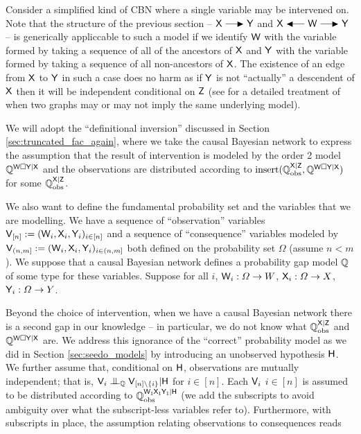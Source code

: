 Consider a simplified kind of CBN where a single variable may be intervened on. Note that the structure of the previous section -- $\RV{X}\longrightarrowRHD \RV{Y}$ and $\RV{X}\longleftarrowRHD \RV{W} \longrightarrowRHD \RV{Y}$ -- is generically appliccable to such a model if we identify $\mathsf{W}$ with the variable formed by taking a sequence of all of the ancestors of $\mathsf{X}$ and $\mathsf{Y}$ with the variable formed by taking a sequence of all non-ancestors of $\mathsf{X}$. The existence of an edge from $\mathsf{X}$ to $\mathsf{Y}$ in such a case does no harm as if $\mathsf{Y}$ is not ``actually'' a descendent of $\mathsf{X}$ then it will be independent conditional on $\mathsf{Z}$ (see \citet{pearl_book_2018} for a detailed treatment of when two graphs may or may not imply the same underlying model).

We will adopt the ``definitional inversion'' discussed in Section \ref{sec:truncated_fac_again}, where we take the causal Bayesian network to express the assumption that the result of intervention is modeled by the order 2 model $\mathbb{Q}^{\mathsf{W}\square \mathsf{Y}|\mathsf{X}}$ and the observations are distributed according to $\text{insert}(\mathbb{Q}_{\text{obs}}^{\mathsf{X}|\mathsf{Z}},\mathbb{Q}^{\mathsf{W}\square\mathsf{Y}|\mathsf{X}})$ for some $\mathbb{Q}_{\text{obs}}^{\mathsf{X}|\mathsf{Z}}$.

We also want to define the fundamental probability set and the variables that we are modelling. We have a sequence of ``observation'' variables $\mathsf{V}_{[n]}:=(\mathsf{W}_i,\mathsf{X}_i,\mathsf{Y}_i)_{i\in [n]}$ and a sequence of ``consequence'' variables modeled by $\mathsf{V}_{(n,m]}:=(\mathsf{W}_i,\mathsf{X}_i,\mathsf{Y}_i)_{i\in (n,m]}$ both defined on the probability set $\Omega$ (assume $n<m$). We suppose that a causal Bayesian network defines a probability gap model $\mathbb{Q}$ of some type for these variables. Suppose for all $i$, $\mathsf{W}_i:\Omega\to W$, $\mathsf{X}_i:\Omega\to X$, $\mathsf{Y}_i:\Omega\to Y$.

Beyond the choice of intervention, when we have a causal Bayesian network there is a second gap in our knowledge -- in particular, we do not know what $\mathbb{Q}_{\text{obs}}^{\mathsf{X}|\mathsf{Z}}$ and $\mathbb{Q}^{\mathsf{W}\square\mathsf{Y}|\mathsf{X}}$ are. We address this ignorance of the ``correct'' probability model as we did in Section \ref{sec:seedo_models} by introducing an unobserved hypothesis $\mathsf{H}$. We further assume that, conditional on $\mathsf{H}$, observations are mutually independent; that is, $\RV{V}_i\CI_{\model{Q}} \RV{V}_{[n]\setminus \{i\}}|\RV{H}$ for $i\in [n]$. Each $\mathsf{V}_i$ $i\in [n]$ is assumed to be distributed according to $\mathbb{Q}_{\text{obs}}^{\mathsf{W_1X_1Y_1}|\mathsf{H}}$ (we add the subscripts to avoid ambiguity over what the subscript-less variables refer to). Furthermore, with subscripts in place, the assumption relating observations to consequences reads

